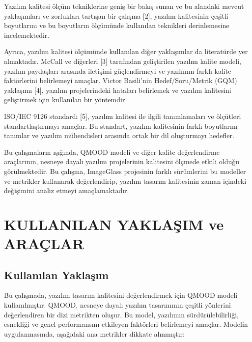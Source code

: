 \documentclass[conference]{IEEEtran}
\begin{document}
Yazılım kalitesi ölçüm tekniklerine geniş bir bakış sunan ve bu alandaki mevcut yaklaşımları ve zorlukları tartışan bir çalışma [2], yazılım kalitesinin çeşitli boyutlarını ve bu boyutların ölçümünde kullanılan teknikleri derinlemesine incelemektedir.

Ayrıca, yazılım kalitesi ölçümünde kullanılan diğer yaklaşımlar da literatürde yer almaktadır. McCall ve diğerleri [3] tarafından geliştirilen yazılım kalite modeli, yazılım paydaşları arasında iletişimi güçlendirmeyi ve yazılımın farklı kalite faktörlerini belirlemeyi amaçlar. Victor Basili'nin Hedef/Soru/Metrik (GQM) yaklaşımı [4], yazılım projelerindeki hataları belirlemek ve yazılım kalitesini geliştirmek için kullanılan bir yöntemdir.

ISO/IEC 9126 standardı [5], yazılım kalitesi ile ilgili tanımlamaları ve ölçütleri standartlaştırmayı amaçlar. Bu standart, yazılım kalitesinin farklı boyutlarını tanımlar ve yazılım mühendisleri arasında ortak bir dil oluşturmayı hedefler.

Bu çalışmaların ışığında, QMOOD modeli ve diğer kalite değerlendirme araçlarının, nesneye dayalı yazılım projelerinin kalitesini ölçmede etkili olduğu görülmektedir. Bu çalışma, ImageGlass projesinin farklı sürümlerini bu modeller ve metrikler kullanarak değerlendirip, yazılım tasarım kalitesinin zaman içindeki değişimini analiz etmeyi amaçlamaktadır.

\section{KULLANILAN YAKLAŞIM ve ARAÇLAR}\label{sec:uc}

\subsection{Kullanılan Yaklaşım}
Bu çalışmada, yazılım tasarım kalitesini değerlendirmek için QMOOD modeli kullanılmıştır. QMOOD, nesneye dayalı yazılım tasarımının çeşitli yönlerini değerlendiren bir dizi metrikten oluşur. Bu model, yazılımın sürdürülebilirliği, esnekliği ve genel performansını etkileyen faktörleri belirlemeyi amaçlar. Modelin uygulanmasında, aşağıdaki ana metrikler dikkate alınmıştır:
\end{document}
